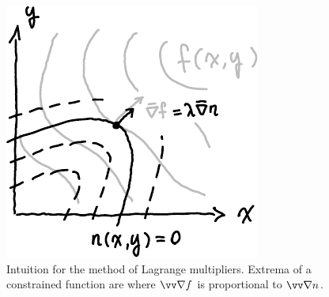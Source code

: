 \documentclass[twocolumn, margin=normal]{tex/hsrzf}
\theoremstyle{fuvarzf}
\begin{document}
\begin{figure}
  \centering
  \includegraphics{img/lagrange-multipliers}
  \caption{
    Intuition for the method of Lagrange multipliers.  Extrema of a constrained
    function are where \(\grad f\) is proportional to \(\grad n\).
  }
\end{figure}
\end{document}
